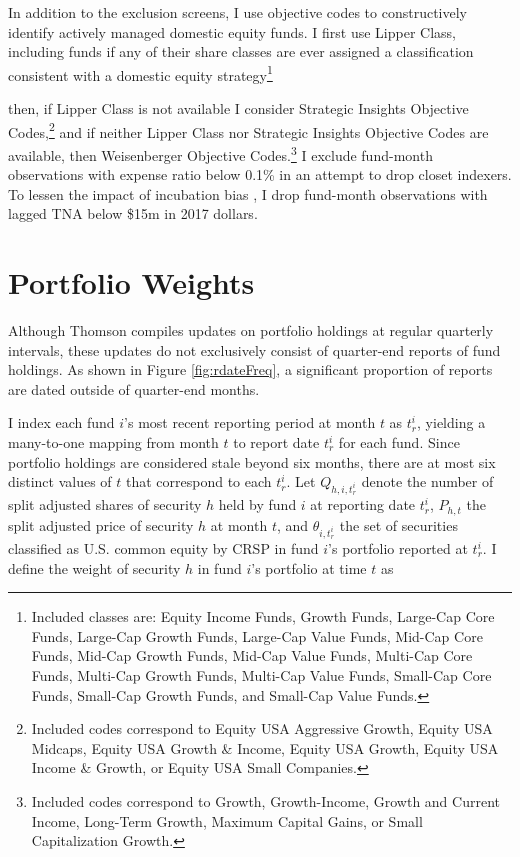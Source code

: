 \documentclass[openany]{book}
\let\rmarkdownfootnote\footnote%
\def\footnote{\protect\rmarkdownfootnote}
\theoremstyle{definition}
\theoremstyle{definition}
\theoremstyle{definition}
\theoremstyle{remark}
\begin{document}
In addition to the exclusion screens, I use objective codes to
constructively identify actively managed domestic equity funds. I first
use Lipper Class, including funds if any of their share classes are ever
assigned a classification consistent with a domestic equity
strategy\footnote{Included classes are: Equity Income Funds, Growth
  Funds, Large-Cap Core Funds, Large-Cap Growth Funds, Large-Cap Value
  Funds, Mid-Cap Core Funds, Mid-Cap Growth Funds, Mid-Cap Value Funds,
  Multi-Cap Core Funds, Multi-Cap Growth Funds, Multi-Cap Value Funds,
  Small-Cap Core Funds, Small-Cap Growth Funds, and Small-Cap Value
  Funds.}

then, if Lipper Class is not available I consider Strategic Insights
Objective Codes,\footnote{Included codes correspond to Equity USA
  Aggressive Growth, Equity USA Midcaps, Equity USA Growth \& Income,
  Equity USA Growth, Equity USA Income \& Growth, or Equity USA Small
  Companies.} and if neither Lipper Class nor Strategic Insights
Objective Codes are available, then Weisenberger Objective
Codes.\footnote{Included codes correspond to Growth, Growth-Income,
  Growth and Current Income, Long-Term Growth, Maximum Capital Gains, or
  Small Capitalization Growth.} I exclude fund-month observations with
expense ratio below 0.1\% in an attempt to drop closet indexers. To
lessen the impact of incubation bias \citep{evans10}, I drop fund-month
observations with lagged TNA below \$15m in 2017 dollars.

\section{Portfolio Weights}\label{sec:portfolioWeights}

Although Thomson compiles updates on portfolio holdings at regular
quarterly intervals, these updates do not exclusively consist of
quarter-end reports of fund holdings. As shown in Figure
\ref{fig:rdateFreq}, a significant proportion of reports are dated
outside of quarter-end months.

I index each fund \(i\)'s most recent reporting period at month \(t\) as
\(t^i_r\), yielding a many-to-one mapping from month \(t\) to report
date \(t^i_r\) for each fund. Since portfolio holdings are considered
stale beyond six months, there are at most six distinct values of \(t\)
that correspond to each \(t^i_r\). Let \(Q_{h,i,t^i_r}\) denote the
number of split adjusted shares of security \(h\) held by fund \(i\) at
reporting date \(t^i_r\), \(P_{h,t}\) the split adjusted price of
security \(h\) at month \(t\), and \(\theta_{i,t^i_r}\) the set of
securities classified as U.S. common equity by CRSP in fund \(i\)'s
portfolio reported at \(t^i_r\). I define the weight of security \(h\)
in fund \(i\)'s portfolio at time \(t\) as
\end{document}
